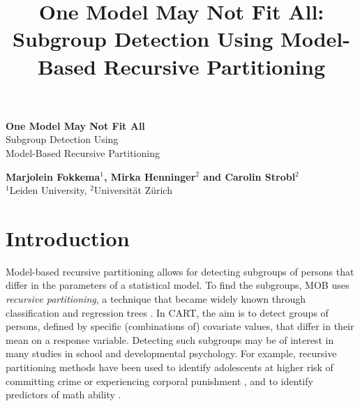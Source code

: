 \documentclass[doc,floatsintext,natbib]{apa7}
\title{One Model May Not Fit All: Subgroup Detection Using Model-Based Recursive Partitioning}
\begin{document}

\renewenvironment{Schunk}{\small}{}



\begin{titlepage}
   \begin{center}
       \vspace*{1cm}

       \textbf{\large One Model May Not Fit All}\\

       \vspace{0.5cm}
        \large Subgroup Detection Using\\Model-Based Recursive Partitioning\\
            
       \vspace{1.5cm}

       \textbf{Marjolein Fokkema$^1$, Mirka Henninger$^2$ and Carolin Strobl$^2$}\\
       $^1$Leiden University, $^2$Universit\"at Z\"urich

       \vfill

            
       \vspace{0.8cm}
     

   \end{center}
\end{titlepage}


\maketitle



\newpage
\section{Introduction}
\label{sec:Introduction}

Model-based recursive partitioning \citep[MOB;][]{ZeilyHoth08} %
allows for detecting subgroups of persons that differ in the parameters of a statistical model. To find the subgroups, MOB uses \textit{recursive partitioning}, a technique that became widely known through classification and regression trees \citep[CART; ][]{Breetal:1984}. In CART, the aim is to detect groups of persons, defined by specific (combinations of) covariate values, that differ in their mean on a response variable. Detecting such subgroups may be of interest in many studies in school and developmental psychology. For example, recursive partitioning methods have been used to identify adolescents at higher risk of committing crime \citep{FrityHaup19} or experiencing corporal punishment \citep{StemyHein19}, and to identify predictors of math ability \citep{DingyZhao19}.
\end{document}
